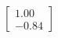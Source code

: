 \documentclass[preview]{standalone}
\begin{document}
\begin{align*}
\begin{bmatrix} 1.00 \\ -0.84 \end{bmatrix}
\end{align*}
\end{document}

